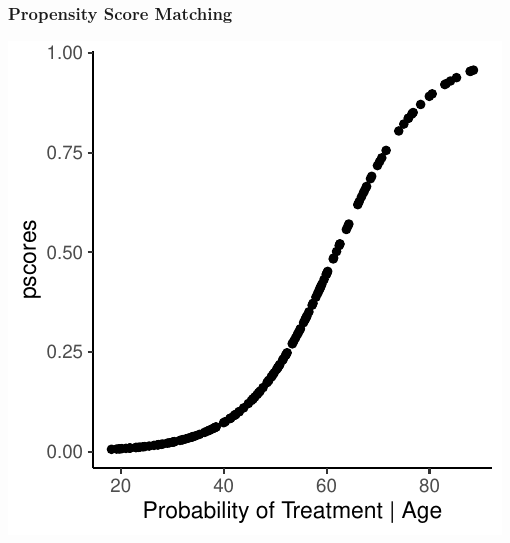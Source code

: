 \documentclass[xcolor=x11names,compress]{beamer}\usepackage[]{graphicx}\usepackage[]{color}
\makeatletter
\def\maxwidth{ %
  \ifdim\Gin@nat@width>\linewidth
    \linewidth
  \else
    \Gin@nat@width
  \fi
}
\newenvironment{knitrout}{}{} %
\renewcommand{\(}{\begin{columns}}
\renewcommand{\)}{\end{columns}}
\newcommand{\<}[1]{\begin{column}{#1}}
\renewcommand{\>}{\end{column}}
\makeatother
\begin{document}
\begin{frame}
\frametitle{Propensity Score Matching}
\begin{center}
\begin{knitrout}
\color{fgcolor}
\includegraphics[width=\maxwidth]{figure/pscore_matching_2-1} 

\end{knitrout}
\end{center}
\end{frame}
\end{document}
